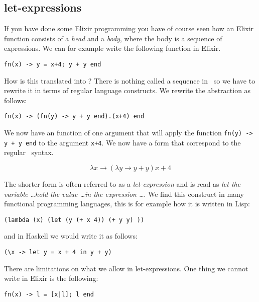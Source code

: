 \documentclass[a4paper,11pt]{article}
\begin{document}
\subsection{let-expressions}   

If you have done some Elixir programming you have of course seen how
an Elixir function consists of a {\em head} and a {\em body}, where the
body is a sequence of expressions. We can for example write the
following function in Elixir.

\vspace{10pt}
\begin{center}{\tt fn(x) ->  y = x+4; y + y end}
\end{center}
\vspace{10pt}

How is this translated into \lamc? There is nothing called a sequence
in \lamc\ so we have to rewrite it in terms of regular language
constructs. We rewrite the abstraction as follows:

\vspace{10pt}
\begin{center}{\tt fn(x) -> (fn(y) -> y + y end).(x+4) end}
\end{center}
\vspace{10pt}

We now have an function of one argument that will apply the
function {\tt fn(y) -> y + y end} to the argument {\tt x+4}.  We
now have a form that correspond to the regular \lamc\ syntax.

$$\lambda x \rightarrow (\lambda y \rightarrow y + y) x+4$$

The shorter form is often referred to as a {\em let-expression} and is
read as {\em let the variable \ldots hold the value \ldots in the
  expression \ldots}. We find this construct in many functional
programming languages, this is for example how it is written in Lisp:
\begin{center}{\tt  (lambda (x) (let (y (+ x 4))  (+ y y) ))}
\end{center}
and in Haskell we would write it as follows:
\begin{center}{\tt  (\textbackslash x  -> let  y = x + 4  in  y + y)}
\end{center}

There are limitations on what we allow in let-expressions. One
thing we cannot write in Elixir is the following:

\begin{center}{\tt fn(x) -> l = [x|l];  l end}
\end{center}
\end{document}

